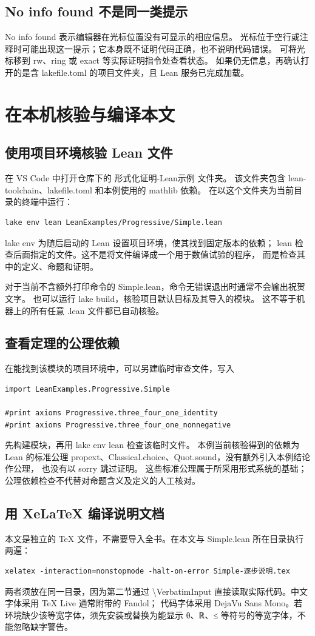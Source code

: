 \documentclass[UTF8,fontset=fandol,a4paper,11pt]{ctexart}
\newcommand{\code}[1]{{\small\ttfamily\def\_{\textunderscore\allowbreak}#1}}
\newcommand{\step}[1]{\Needspace{7\baselineskip}\subsection{#1}}
\begin{document}
\step{\code{No info found} 不是同一类提示}
\code{No info found} 表示编辑器在光标位置没有可显示的相应信息。
光标位于空行或注释时可能出现这一提示；它本身既不证明代码正确，也不说明代码错误。
可将光标移到 \code{rw}、\code{ring} 或 \code{exact} 等实际证明指令处查看状态。
如果仍无信息，再确认打开的是含 \code{lakefile.toml} 的项目文件夹，且 Lean 服务已完成加载。

\section{在本机核验与编译本文}

\step{使用项目环境核验 Lean 文件}
在 VS Code 中打开仓库下的 \code{形式化证明-Lean示例} 文件夹。
该文件夹包含 \code{lean-toolchain}、\code{lakefile.toml} 和本例使用的 mathlib 依赖。
在以这个文件夹为当前目录的终端中运行：
\begin{Verbatim}
lake env lean LeanExamples/Progressive/Simple.lean
\end{Verbatim}
\code{lake env} 为随后启动的 Lean 设置项目环境，使其找到固定版本的依赖；
\code{lean} 检查后面指定的文件。这不是将文件编译成一个用于数值试验的程序，
而是检查其中的定义、命题和证明。

对于当前不含额外打印命令的 \code{Simple.lean}，命令无错误退出时通常不会输出祝贺文字。
也可以运行 \code{lake build}，核验项目默认目标及其导入的模块。
这不等于机器上的所有任意 \code{.lean} 文件都已自动核验。

\step{查看定理的公理依赖}
在能找到该模块的项目环境中，可以另建临时审查文件，写入
\begin{Verbatim}
import LeanExamples.Progressive.Simple

#print axioms Progressive.three_four_one_identity
#print axioms Progressive.three_four_one_nonnegative
\end{Verbatim}
先构建模块，再用 \code{lake env lean} 检查该临时文件。
本例当前核验得到的依赖为 Lean 的标准公理
\code{propext}、\code{Classical.choice}、\code{Quot.sound}，没有额外引入本例结论作公理，
也没有以 \code{sorry} 跳过证明。
这些标准公理属于所采用形式系统的基础；公理依赖检查不代替对命题含义及定义的人工核对。

\step{用 XeLaTeX 编译说明文档}
本文是独立的 TeX 文件，不需要导入全书。在本文与 \code{Simple.lean} 所在目录执行两遍：
\begin{Verbatim}
xelatex -interaction=nonstopmode -halt-on-error Simple-逐步说明.tex
\end{Verbatim}
两者须放在同一目录，因为第二节通过 \code{\textbackslash VerbatimInput}
直接读取实际代码。中文字体采用 TeX Live 通常附带的 Fandol；
代码字体采用 DejaVu Sans Mono。若环境缺少该等宽字体，须先安装或替换为能显示
\code{θ}、\code{ℝ}、\code{≤} 等符号的等宽字体，不能忽略缺字警告。
\end{document}

